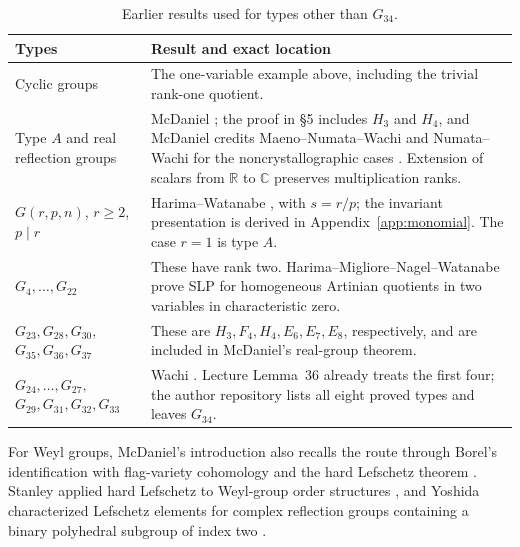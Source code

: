 \documentclass[11pt]{article}
\theoremstyle{definition}
\newcommand{\C}{\mathbb C}
\begin{document}
\begin{table}[ht]
\centering\small
\caption{Earlier results used for types other than $G_{34}$.}
\label{tab:coverage}
\begin{tabular}{@{}p{}p{}@{}}
\toprule
Types & Result and exact location \\
\midrule
Cyclic groups & The one-variable example above, including the trivial
rank-one quotient. \\[3pt]
Type $A$ and real reflection groups & McDaniel \cite[Theorem~1]{McD};
the proof in \S5 includes $H_3$ and $H_4$, and McDaniel credits
Maeno--Numata--Wachi \cite{MNW} and Numata--Wachi \cite{NW07} for the
noncrystallographic cases \cite[Introduction and \S5]{McD}. Extension
of scalars from $\mathbb R$ to $\C$ preserves multiplication ranks. \\[3pt]
$G(r,p,n)$, $r\geq2$, $p\mid r$ & Harima--Watanabe
\cite[Notation and Remark~6.3, Examples~6.4 and~6.8]{HW06}, with $s=r/p$;
the invariant presentation is derived in Appendix~\ref{app:monomial}.
The case $r=1$ is type $A$. \\[3pt]
$G_4,\ldots,G_{22}$ & These have rank two. Harima--Migliore--Nagel--Watanabe
\cite[Proposition~4.4]{HMNW} prove SLP for homogeneous Artinian
quotients in two variables in characteristic zero. \\[3pt]
$G_{23},G_{28},G_{30},$\newline$G_{35},G_{36},G_{37}$ & These are
$H_3,F_4,H_4,E_6,E_7,E_8$, respectively, and are included in
McDaniel's real-group theorem. \\[3pt]
$G_{24},\ldots,G_{27},$\newline$G_{29},G_{31},G_{32},G_{33}$ &
Wachi \cite{Wachi25,WachiCode}. Lecture Lemma~36 already treats the
first four; the author repository lists all eight proved types and
leaves $G_{34}$. \\
\bottomrule
\end{tabular}
\end{table}

For Weyl groups, McDaniel's introduction also recalls the route through
Borel's identification with flag-variety cohomology and the hard
Lefschetz theorem \cite[Introduction]{McD}. Stanley applied hard
Lefschetz to Weyl-group order structures \cite{Stanley80}, and Yoshida
characterized Lefschetz elements for complex reflection groups containing
a binary polyhedral subgroup of index two \cite{Yoshida}.
\end{document}
